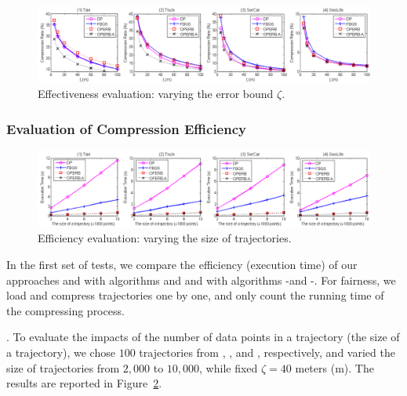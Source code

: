 \begin{figure}[tb!]
\centering
\includegraphics[scale=0.465]{figures/exp-CompressionRatio.png}
\vspace{-2.5ex}
\caption{\small Effectiveness evaluation: varying the error bound $\zeta$.}
\label{fig:cr}
\vspace{-.5ex}
\end{figure}




\subsubsection{Evaluation of Compression Efficiency}

\begin{figure}[tb!]
\centering
\includegraphics[scale = 0.465]{figures/Exp-time-size.png}
\vspace{-2.5ex}
\caption{\small Efficiency evaluation: varying the size of trajectories.}\label{fig:time-size}
\vspace{-1ex}
\end{figure}


In the first set of tests, we compare the efficiency (execution time) of our approaches \operb and \operba with algorithms \dpa and \fbqsa
and with algorithms -\operb and -\operba.
For fairness, we load and compress trajectories one by one, and only count the running time of the compressing process.


.
To evaluate the impacts of the number of data points in a trajectory (\ie the size of a trajectory),
we chose $100$ trajectories from \taxi, \truck, \sercar and \geolife, respectively,
and varied the size  of trajectories from $2,000$ to $10,000$, while fixed $\zeta = 40$ meters (m).
The results are reported in Figure~\ref{fig:time-size}.

